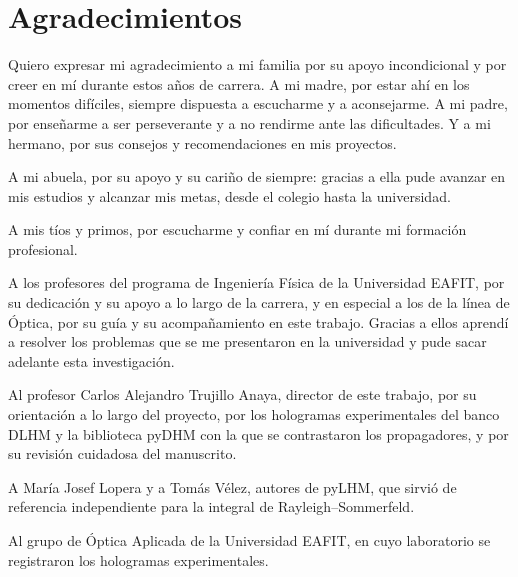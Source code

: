 \chapter*{Agradecimientos}

Quiero expresar mi agradecimiento a mi familia por su apoyo incondicional y por
creer en mí durante estos años de carrera. A mi madre, por estar ahí en los
momentos difíciles, siempre dispuesta a escucharme y a aconsejarme. A mi padre,
por enseñarme a ser perseverante y a no rendirme ante las dificultades. Y a mi
hermano, por sus consejos y recomendaciones en mis proyectos.

A mi abuela, por su apoyo y su cariño de siempre: gracias a ella pude avanzar
en mis estudios y alcanzar mis metas, desde el colegio hasta la universidad.

A mis tíos y primos, por escucharme y confiar en mí durante mi formación
profesional.

A los profesores del programa de Ingeniería Física de la Universidad EAFIT, por
su dedicación y su apoyo a lo largo de la carrera, y en especial a los de la
línea de Óptica, por su guía y su acompañamiento en este trabajo. Gracias a
ellos aprendí a resolver los problemas que se me presentaron en la universidad
y pude sacar adelante esta investigación.

Al profesor Carlos Alejandro Trujillo Anaya, director de este trabajo, por su
orientación a lo largo del proyecto, por los hologramas experimentales del
banco DLHM y la biblioteca pyDHM con la que se contrastaron los propagadores,
y por su revisión cuidadosa del manuscrito.

A María Josef Lopera y a Tomás Vélez, autores de pyLHM, que sirvió de
referencia independiente para la integral de Rayleigh--Sommerfeld.

Al grupo de Óptica Aplicada de la Universidad EAFIT, en cuyo laboratorio se
registraron los hologramas experimentales.
